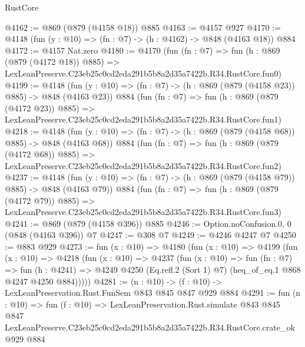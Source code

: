 \begin{lexlean}{RustCore}
\begin{coremodule}
@4162 := @869 (@879 (@4158 @18)) @885
@4163 := @4157 @927
@4170 := @4148 (fun (y : @10) => (fn : @7) -> (h : @4162) -> @848 (@4163 @18)) @884
@4172 := @4157 Nat.zero
@4180 := @4170
    (fun (fn : @7) =>
    fun (h : @869 (@879 (@4172 @18)) @885) =>
    LexLeanPreserve.C23eb25c0cd2eda291b5b8a2d35a7422b.R34.RustCore.fun0)
@4199 := @4148
    (fun (y : @10) => (fn : @7) -> (h : @869 (@879 (@4158 @23)) @885) -> @848 (@4163 @23))
    @884
    (fun (fn : @7) =>
    fun (h : @869 (@879 (@4172 @23)) @885) =>
    LexLeanPreserve.C23eb25c0cd2eda291b5b8a2d35a7422b.R34.RustCore.fun1)
@4218 := @4148
    (fun (y : @10) => (fn : @7) -> (h : @869 (@879 (@4158 @68)) @885) -> @848 (@4163 @68))
    @884
    (fun (fn : @7) =>
    fun (h : @869 (@879 (@4172 @68)) @885) =>
    LexLeanPreserve.C23eb25c0cd2eda291b5b8a2d35a7422b.R34.RustCore.fun2)
@4237 := @4148
    (fun (y : @10) => (fn : @7) -> (h : @869 (@879 (@4158 @79)) @885) -> @848 (@4163 @79))
    @884
    (fun (fn : @7) =>
    fun (h : @869 (@879 (@4172 @79)) @885) =>
    LexLeanPreserve.C23eb25c0cd2eda291b5b8a2d35a7422b.R34.RustCore.fun3)
@4241 := @869 (@879 (@4158 @396)) @885
@4246 := Option.noConfusion.{0, 0} (@848 (@4163 @396)) @7
@4247 := @308 @7
@4249 := @4246 @4247 @7
@4250 := @883 @929
@4273 := fun (x : @10) =>
  @4180
    (fun (x : @10) =>
    @4199
      (fun (x : @10) =>
      @4218
        (fun (x : @10) =>
        @4237
          (fun (x : @10) =>
          fun (fn : @7) =>
          fun (h : @4241) =>
          @4249 @4250 (Eq.refl.{2} (Sort 1) @7) (heq_of_eq.{1} @868 @4247 @4250 @884)))))
@4281 := (n : @10) -> (f : @10) -> LexLeanPreservation.Rust.FunSem @843 @845 @847 @929 @884
@4291 := fun (n : @10) =>
  fun (f : @10) =>
  LexLeanPreservation.Rust.simulate
    @843
    @845
    @847
    LexLeanPreserve.C23eb25c0cd2eda291b5b8a2d35a7422b.R34.RustCore.crate_ok
    @929
    @884
\end{coremodule}
\end{lexlean}
